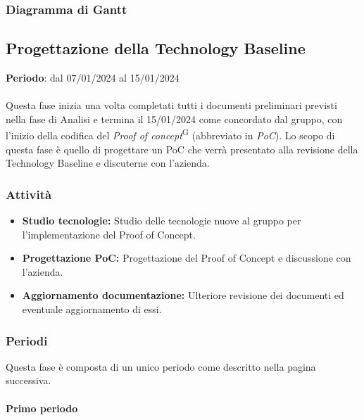 \newpage 
\subsubsection{Diagramma di Gantt}\label{sec:pianificazione:analisi:gantt}


\subsection{Progettazione della Technology Baseline}\label{sec:pianificazione:progRTB}

\textbf{Periodo}: dal 07/01/2024 al 15/01/2024\\\\
Questa fase inizia una volta completati tutti i documenti preliminari previsti nella fase di Analisi e termina il 15/01/2024 come concordato dal gruppo, con l'inizio della codifica del \textit{Proof of concept}\textsuperscript{G} (abbreviato in \textit{PoC}). Lo scopo di questa fase è quello di progettare un PoC che verrà presentato alla revisione della Technology Baseline e discuterne con l'azienda.

\subsubsection{Attività}\label{sec:pianificazione:progRTB:attivita}
\begin{itemize}
    \item \textbf{Studio tecnologie:} Studio delle tecnologie nuove al gruppo per l'implementazione del Proof of Concept.
    \item \textbf{Progettazione PoC:} Progettazione del Proof of Concept e discussione con l'azienda.
    \item \textbf{Aggiornamento documentazione:} Ulteriore revisione dei documenti ed eventuale aggiornamento di essi.
\end{itemize}

\subsubsection{Periodi}\label{sec:pianificazione:progRTB:periodi}
Questa fase è composta di un unico periodo come descritto nella pagina successiva.

\newpage

\paragraph{Primo periodo}\label{sec:pianificazione:progRTB:periodi:primo}

